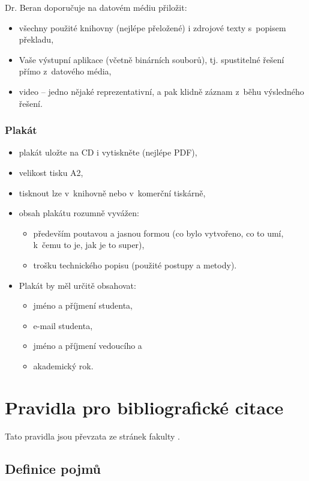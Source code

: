 \noindent Dr. Beran doporučuje na datovém médiu přiložit:
\begin{itemize}
  \item{všechny použité knihovny (nejlépe přeložené) i zdrojové texty s~popisem překladu,}
  \item{Vaše výstupní aplikace (včetně binárních souborů), tj. spustitelné řešení přímo z~datového média,}
  \item{video -- jedno nějaké reprezentativní, a pak klidně záznam z~běhu výsledného řešení.}
\end{itemize}

\subsection*{Plakát} 
\begin{itemize}
  \item{plakát uložte na CD i vytiskněte (nejlépe PDF),}
  \item{velikost tisku A2,}
  \item{tisknout lze v~knihovně nebo v~komerční tiskárně,}
  \item{obsah plakátu rozumně vyvážen:
  \begin{itemize}
    \item{především poutavou a jasnou formou (co bylo vytvořeno, co to umí, k~čemu to je, jak je to super),}
    \item{trošku technického popisu (použité postupy a metody).}
  \end{itemize}}
  \item{Plakát by měl určitě obsahovat:
  	\begin{itemize}
      \item jméno a příjmení studenta,
      \item e-mail studenta, 
      \item jméno a příjmení vedoucího a 
      \item akademický rok. 
  	\end{itemize}
    }
\end{itemize}


\chapter{Pravidla pro bibliografické citace}
\label{citace}

Tato pravidla jsou převzata ze stránek fakulty \cite{citace}.

\section{Definice pojmů}

